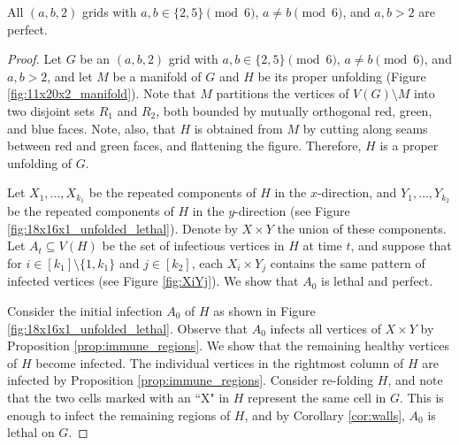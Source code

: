 
\begin{con}
\label{con:2x2x5_mod6}
All $(a,b,2)$ grids with $a,b \in \{2,5\} \pmod 6$, $a \neq b \pmod 6$, and $a,b > 2$ are perfect. 
\end{con}

\begin{proof}
Let $G$ be an $(a,b,2)$ grid with $a,b \in \{2,5\} \pmod 6$, $a \neq b \pmod 6$, and $a,b > 2$, and let $M$ be a manifold of $G$ and $H$ be its proper unfolding (Figure \ref{fig:11x20x2_manifold}). Note that $M$ partitions the vertices of $V(G) \setminus M$ into two disjoint sets $R_1$ and $R_2$, both bounded by mutually orthogonal red, green, and blue faces. Note, also, that $H$ is obtained from $M$ by cutting along seams between red and green faces, and flattening the figure. Therefore, $H$ is a proper unfolding of $G$. 

Let $X_1, \dots, X_{k_1}$ be the repeated components of $H$ in the $x$-direction, and $Y_1, \dots, Y_{k_2}$ be the repeated components of $H$ in the $y$-direction (see Figure \ref{fig:18x16x1_unfolded_lethal}). Denote by $X \times Y$ the union of these components. Let $A_t \subseteq V(H)$ be the set of infectious vertices in $H$ at time $t$, and suppose that for $i \in [k_1] \setminus \{1,k_1\}$ and $j \in [k_2]$, each $X_i \times Y_j$ contains the same pattern of infected vertices (see Figure \ref{fig:XiYj}). We show that $A_0$ is lethal and perfect.

Consider the initial infection $A_0$ of $H$ as shown in Figure \ref{fig:18x16x1_unfolded_lethal}. Observe that $A_0$ infects all vertices of $X\times Y$ by Proposition \ref{prop:immune_regions}. We show that the remaining healthy vertices of $H$ become infected. The individual vertices in the rightmost column of $H$ are infected by Proposition \ref{prop:immune_regions}. Consider re-folding $H$, and note that the two cells marked with an ``X" in $H$ represent the same cell in $G$. This is enough to infect the remaining regions of $H$, and by Corollary \ref{cor:walls}, $A_0$ is lethal on $G$. 


\end{proof}
